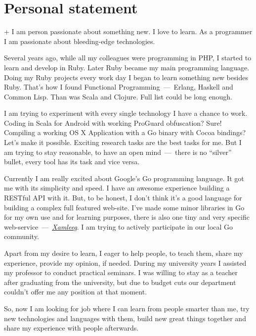 \documentclass[12pt,a4paper,final]{moderncv}
\begin{document}
\section{Personal statement}
{\parindent=1cm
  \begin{adjustwidth}{\hintscolumnwidth+\separatorcolumnwidth}{}
    \noindent I am person passionate about something new. I love to learn. As a programmer I am passionate about bleeding-edge technologies.

    Several years ago, while all my colleagues were programming in PHP, I started to learn and develop in Ruby. Later Ruby became my main programming language. Doing my Ruby projects every work day I began to learn something new besides Ruby. That's how I found Functional Programming~---~Erlang, Haskell and Common Lisp. Than was Scala and Clojure. Full list could be long enough.

    I am trying to experiment with every single technology I have a chance to work. Coding in Scala for Android with working ProGuard obfuscation? Sure! Compiling a working OS X Application with a Go binary with Cocoa bindings? Let's make it possible. Exciting research tasks are the best tasks for me. But I am trying to stay reasonable, to have an open mind~---~there is no ``silver'' bullet, every tool has its task and vice versa.

    Currently I am really excited about Google's Go programming language. It got me with its simplicity and speed. I have an awesome experience building a RESTful API with it. But, to be honest, I don't think it's a good language for building a complex full featured web-site. I've made some minor libraries in Go for my own use and for learning purposes, there is also one tiny and very specific web-service~---~\underline{\href{http://xamleeg.kavu.ru/}{\itshape Xamleeg}}. I am trying to actively participate in our local Go community.

    Apart from my desire to learn, I eager to help people, to teach them, share my experience, provide my opinion, if needed. During my university years I assisted my professor to conduct practical seminars. I was willing to stay as a teacher after graduating from the university, but due to budget cuts our department couldn't offer me any position at that moment.

    So, now I am looking for job where I can learn from people smarter than me, try new technologies and languages with them, build new great things together and share my experience with people afterwards.
  \end{adjustwidth}
}
\end{document}
